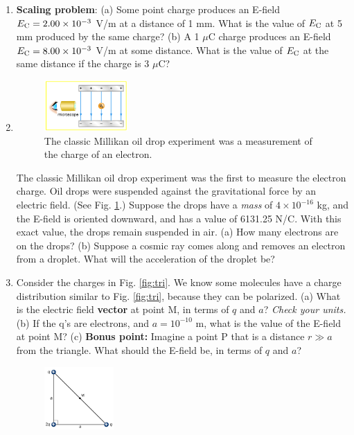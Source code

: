 \documentclass[10pt]{article}
\begin{document}
\begin{enumerate}
\item \textbf{Scaling problem}: (a) Some point charge produces an E-field $E_{\rm C} = 2.00 \times 10^{-3}$ V/m at a distance of 1 mm. What is the value of $E_{\rm C}$ at 5 mm produced by the same charge? (b) A 1 $\mu$C charge produces an E-field $E_{\rm C} = 8.00 \times 10^{-3}$ V/m at some distance.  What is the value of $E_{\rm C}$ at the same distance if the charge is 3 $\mu$C? \\ \vspace{1cm}
\item 
\begin{figure}
\centering
\includegraphics[width=0.3\textwidth]{mill.jpeg}
\caption{\label{fig:mill} The classic Millikan oil drop experiment was a measurement of the charge of an electron.}
\end{figure}
The classic Millikan oil drop experiment was the first to measure the electron charge. Oil drops were suspended against the gravitational force by an electric field. (See Fig. \ref{fig:mill}.) Suppose the drops have a \textit{mass} of $4\times 10^{-16}$ kg, and the E-field is oriented downward, and has a value of 6131.25 N/C.  With this exact value, the drops remain suspended in air.  (a)  How many electrons are on the drops?  (b) Suppose a cosmic ray comes along and removes an electron from a droplet.  What will the acceleration of the droplet be? \\ \vspace{3cm}
\item Consider the charges in Fig. \ref{fig:tri}.  We know some molecules have a charge distribution similar to Fig. \ref{fig:tri}, because they can be polarized.  (a) What is the electric field \textbf{vector} at point M, in terms of $q$ and $a$?  \textit{Check your units.} (b) If the q's are electrons, and $a = 10^{-10}$ m, what is the value of the E-field at point M?  (c) \textbf{Bonus point:} Imagine a point P that is a distance $r \gg a$ from the triangle.  What should the E-field be, in terms of $q$ and $a$?
\begin{figure}[ht]
\centering
\includegraphics[width=0.25\textwidth]{charges1.png}

\end{figure}
\end{enumerate}
\end{document}
